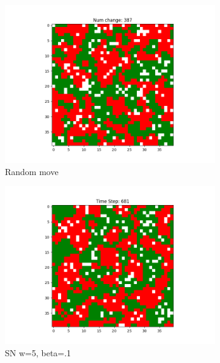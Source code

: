 \documentclass[11pt]{article}
\begin{document}
	\begin{figure}[h]
		\centering
		\begin{subfigure}{0.14\textwidth}
			\includegraphics[width=\linewidth]{final_random.png}
			\caption{\centering Random move}
		\end{subfigure}\hfill
		\begin{subfigure}{0.14\textwidth}
			\includegraphics[width=\linewidth]{final_cluster_w5b10.png}
			\caption{\centering SN w=5, beta=.1}
		\end{subfigure}\hfill
		\begin{subfigure}{0.14\textwidth}

\end{subfigure}
\end{figure}
\end{document}
